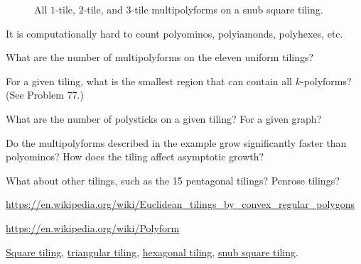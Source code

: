 \documentclass{article}
\begin{document}
\begin{figure}[ht!]
  \caption{
    All $1$-tile, $2$-tile, and $3$-tile multipolyforms on a snub square tiling.
  }
\end{figure}
\begin{note}
  It is computationally hard to count polyominos, polyiamonds, polyhexes, etc.
\end{note}
\begin{question}
  What are the number of multipolyforms on the eleven uniform tilings?
\end{question}

\begin{related}
  \item For a given tiling, what is the smallest region that can
  contain all $k$-polyforms? (See Problem 77.)
  \item What are the number of polysticks on a given tiling? For a given graph?
  \item Do the multipolyforms described in the example grow significantly
  faster than polyominos? How does the tiling affect asymptotic growth?
  \item What about other tilings, such as the 15 pentagonal tilings? Penrose
  tilings?
\end{related}
\begin{references}
  \item \url{https://en.wikipedia.org/wiki/Euclidean_tilings_by_convex_regular_polygons}
  \item \url{https://en.wikipedia.org/wiki/Polyform}
  \item \href{https://oeis.org/A000105}{Square tiling},
    \href{https://oeis.org/A000577}{triangular tiling},
    \href{https://oeis.org/A000228}{hexagonal tiling},
    \href{https://oeis.org/A309159}{snub square tiling}.
\end{references}
\end{document}
